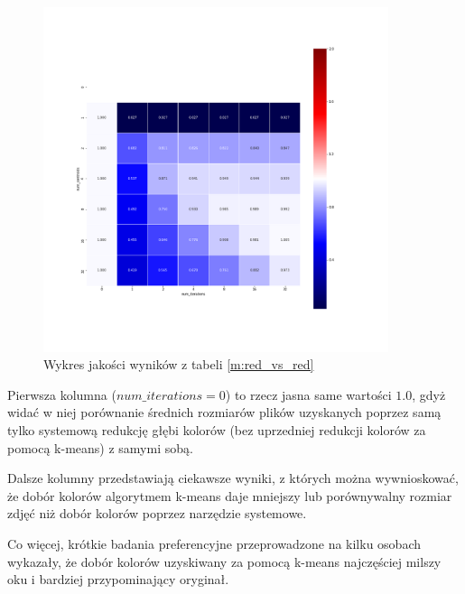 \label{f:red_vs_red}

\begin{figure}[H]
	\includegraphics[width=0.9\textwidth]{photos/plots/red_vs_red}
    \caption{Wykres jakości wyników z tabeli \ref{m:red_vs_red}}
\end{figure}

Pierwsza kolumna ($num\_iterations = 0$) to rzecz jasna same wartości $1.0$, gdyż widać w niej porównanie średnich rozmiarów plików uzyskanych poprzez samą tylko systemową redukcję głębi kolorów (bez uprzedniej redukcji kolorów za pomocą k-means) z samymi sobą.

Dalsze kolumny przedstawiają ciekawsze wyniki, z których można wywnioskować, że dobór kolorów algorytmem k-means daje mniejszy lub porównywalny rozmiar zdjęć niż dobór kolorów poprzez narzędzie systemowe.

Co więcej, krótkie badania preferencyjne przeprowadzone na kilku osobach wykazały, że dobór kolorów uzyskiwany za pomocą k-means najczęściej milszy oku i bardziej przypominający oryginał.


